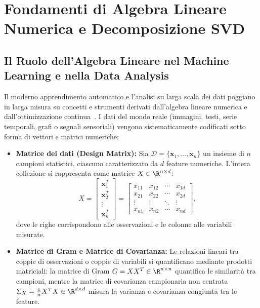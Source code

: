 \chapter{Fondamenti di Algebra Lineare Numerica e Decomposizione SVD}
\label{chap:fondamenti-algebra-lineare-svd}

\FloatBarrier
\section{Il Ruolo dell'Algebra Lineare nel Machine Learning e nella Data Analysis}

Il moderno apprendimento automatico e l'analisi su larga scala dei dati poggiano in larga misura su concetti e strumenti derivati dall'algebra lineare numerica e dall'ottimizzazione continua~\cite{strang2019linear,golub2013matrix}. I dati del mondo reale (immagini, testi, serie temporali, grafi o segnali sensoriali) vengono sistematicamente codificati sotto forma di vettori e matrici numeriche:

\begin{itemize}
    \item \textbf{Matrice dei dati (Design Matrix):} Sia $\mathcal{D} = \{\mathbf{x}_1, \dots, \mathbf{x}_n\}$ un insieme di $n$ campioni statistici, ciascuno caratterizzato da $d$ feature numeriche. L'intera collezione si rappresenta come matrice $X \in \R^{n \times d}$:
    \begin{equation}
        X = \begin{bmatrix}
            \mathbf{x}_1^T \\
            \mathbf{x}_2^T \\
            \vdots \\
            \mathbf{x}_n^T
        \end{bmatrix} = \begin{bmatrix}
            x_{11} & x_{12} & \cdots & x_{1d} \\
            x_{21} & x_{22} & \cdots & x_{2d} \\
            \vdots & \vdots & \ddots & \vdots \\
            x_{n1} & x_{n2} & \cdots & x_{nd}
        \end{bmatrix},
    \end{equation}
    dove le righe corrispondono alle osservazioni e le colonne alle variabili misurate.
    \item \textbf{Matrice di Gram e Matrice di Covarianza:} Le relazioni lineari tra coppie di osservazioni o coppie di variabili si quantificano mediante prodotti matriciali: la matrice di Gram $G = X X^T \in \R^{n \times n}$ quantifica le similarità tra campioni, mentre la matrice di covarianza campionaria non centrata $\Sigma_X = \frac{1}{n} X^T X \in \R^{d \times d}$ misura la varianza e covarianza congiunta tra le feature.
\end{itemize}

